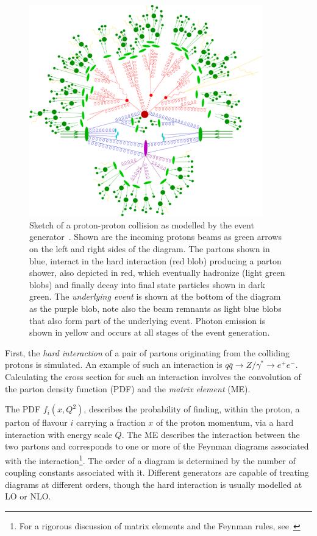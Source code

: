 \begin{figure}[p]
  \centering
  \includegraphics[width=0.90\textwidth]{PartDetector/Diagrams/scetch.eps}
  \caption[Sketch of a proton-proton collision as modelled by the event generator.]{Sketch of a proton-proton collision as modelled by the event generator~\cite{Event}. Shown are the incoming protons beams as green arrows on the left and right sides of the diagram. The partons shown in blue, interact in the hard interaction (red blob) producing a parton shower, also depicted in red, which eventually hadronize (light green blobs) and finally decay into final state particles shown in dark green. The \emph{underlying event} is shown at the bottom of the diagram as the purple blob, note also the beam remnants as light blue blobs that also form part of the underlying event. Photon emission is shown in yellow and occurs at all stages of the event generation.}\label{fig:DetectorEGSketch}
\end{figure}

First, the \emph{hard interaction} of a pair of partons originating from the colliding protons is simulated. An example of such an interaction is $q\bar{q} \rightarrow Z / \gamma^{*}\rightarrow e^{+}e^{-}$. Calculating the cross section for such an interaction involves the convolution of the parton density function (PDF) and the \emph{matrix element} (ME).

The PDF $f_i(x,Q^2)$, describes the probability of finding, within the proton, a parton of flavour $i$ carrying a fraction $x$ of the proton momentum, via a hard interaction with energy scale $Q$. The ME describes the interaction between the two partons and corresponds to one or more of the Feynman diagrams associated with the interaction\footnote{For a rigorous discussion of matrix elements and the Feynman rules, see~\cite{Theory:Perkins,Theory:IntroGriffiths}}. The order of a diagram is determined by the number of coupling constants associated with it. Different generators are capable of treating diagrams at different orders, though the hard interaction is usually modelled at LO or NLO\@.

